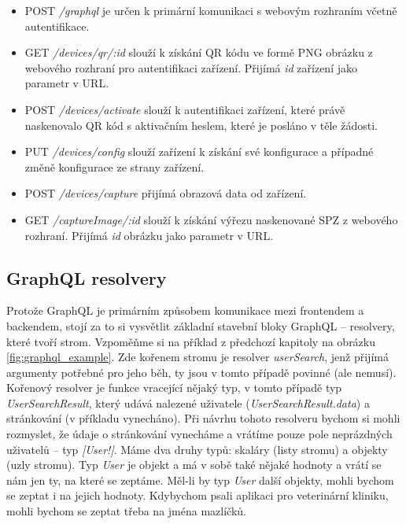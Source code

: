 \begin{itemize}
  \setlength\itemsep{.05em}
  \item POST \textit{/graphql} je určen k primární komunikaci s webovým rozhraním včetně autentifikace.
  \item GET \textit{/devices/qr/:id} slouží k získání QR kódu ve formě PNG obrázku z webového rozhraní pro autentifikaci zařízení.
        Přijímá \textit{id} zařízení jako parametr v URL.
  \item POST \textit{/devices/activate} slouží k autentifikaci zařízení, které právě naskenovalo QR kód s aktivačním heslem, které je posláno v těle žádosti.
  \item PUT \textit{/devices/config} slouží zařízení k získání své konfigurace a případné změně konfigurace ze strany zařízení.
  \item POST \textit{/devices/capture} přijímá obrazová data od zařízení.
  \item GET \textit{/captureImage/:id} slouží k získání výřezu naskenované SPZ z webového rozhraní. Přijímá \textit{id} obrázku jako parametr v URL.
\end{itemize}

\subsection{GraphQL resolvery}

\noindent
Protože GraphQL je primárním způsobem komunikace mezi frontendem a backendem, stojí za to si vysvětlit základní stavební bloky
GraphQL -- resolvery, které tvoří strom. Vzpoměňme si na příklad z předchozí kapitoly na obrázku \ref{fig:graphql_example}.
Zde kořenem stromu je resolver \textit{userSearch}, jenž přijímá argumenty potřebné pro jeho běh, ty jsou v tomto případě
povinné (ale nemusí). Kořenový resolver je funkce vracející nějaký typ, v tomto případě typ \textit{UserSearchResult}, který udává nalezené
uživatele (\textit{UserSearchResult.data}) a stránkování (v příkladu vynecháno).
Při návrhu tohoto resolveru bychom si mohli rozmyslet, že údaje o stránkování vynecháme a vrátíme pouze
pole neprázdných uživatelů -- typ \textit{[User!]}.
Máme dva druhy typů: skaláry (listy stromu) a objekty (uzly stromu).
Typ \textit{User} je objekt a má v sobě také nějaké hodnoty a vrátí se nám jen ty, na které se zeptáme. Měl-li by typ \textit{User}
další objekty, mohli bychom se zeptat i na jejich hodnoty. Kdybychom psali aplikaci pro veterinární kliniku, mohli bychom se zeptat
třeba na jména mazlíčků.

